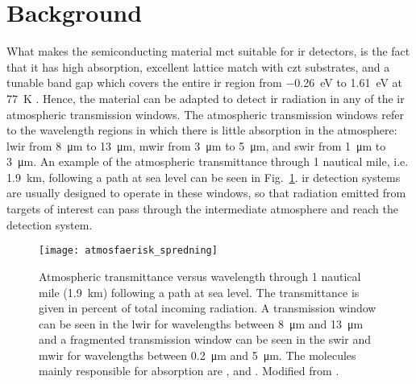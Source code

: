 \section{Background}%

What makes the semiconducting material \ac{mct} suitable for \ac{ir} detectors, is the fact that it has high absorption, excellent lattice match with \ac{czt} substrates, and a tunable band gap which covers the entire \ac{ir} region from \SI{-0.26}{\electronvolt} to \SI{1.61}{\electronvolt} at \SI{77}{\kelvin} \citep{hansen1982energy}. Hence, the material can be adapted to detect \ac{ir} radiation in any of the \ac{ir} atmospheric transmission windows. The atmospheric transmission windows refer to the wavelength regions in which there is little absorption in the atmosphere: \ac{lwir} from \SI{8}{\micro\metre} to \SI{13}{\micro\metre}, \ac{mwir} from \SI{3}{\micro\metre} to \SI{5}{\micro\metre}, and \ac{swir} from \SI{1}{\micro\metre} to \SI{3}{\micro\metre}. An example of the atmospheric transmittance through 1 nautical mile, i.e. \SI{1.9}{\kilo\metre}, following a path at sea level can be seen in Fig.~\ref{fig:atm_window}. \Ac{ir} detection systems are usually designed to operate in these windows, so that radiation emitted from targets of interest can pass through the intermediate atmosphere and reach the detection system.

\begin{figure}[htbp]
    \centering
    \texttt{[image: atmosfaerisk\_spredning]}
    \caption[Atmospheric transmittance versus wavelength.]{Atmospheric transmittance versus wavelength through 1 nautical mile (\SI{1.9}{\kilo\metre}) following a path at sea level. The transmittance is given in percent of total incoming radiation. A transmission window can be seen in the \acf{lwir} for wavelengths between \SI{8}{\micro\metre} and \SI{13}{\micro\metre} and a fragmented transmission window can be seen in the \acf{swir} and \acf{mwir} for wavelengths between \SI{0.2}{\micro\metre} and \SI{5}{\micro\metre}. The molecules mainly responsible for absorption are ,  and . Modified from \citet{naval2013electronic}.}
    \label{fig:atm_window}
\end{figure}

